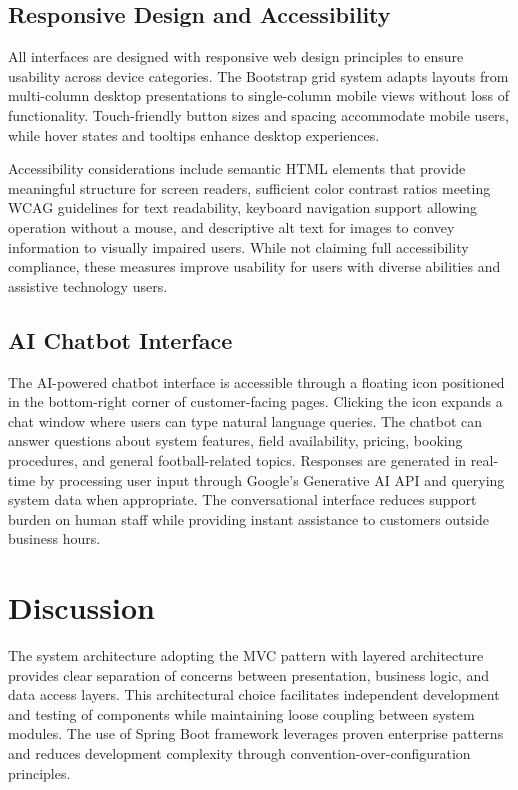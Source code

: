 \subsection{Responsive Design and Accessibility}

All interfaces are designed with responsive web design principles to ensure usability across device categories. The Bootstrap grid system adapts layouts from multi-column desktop presentations to single-column mobile views without loss of functionality. Touch-friendly button sizes and spacing accommodate mobile users, while hover states and tooltips enhance desktop experiences.

Accessibility considerations include semantic HTML elements that provide meaningful structure for screen readers, sufficient color contrast ratios meeting WCAG guidelines for text readability, keyboard navigation support allowing operation without a mouse, and descriptive alt text for images to convey information to visually impaired users. While not claiming full accessibility compliance, these measures improve usability for users with diverse abilities and assistive technology users.

\subsection{AI Chatbot Interface}

The AI-powered chatbot interface is accessible through a floating icon positioned in the bottom-right corner of customer-facing pages. Clicking the icon expands a chat window where users can type natural language queries. The chatbot can answer questions about system features, field availability, pricing, booking procedures, and general football-related topics. Responses are generated in real-time by processing user input through Google's Generative AI API and querying system data when appropriate. The conversational interface reduces support burden on human staff while providing instant assistance to customers outside business hours.

\section{Discussion}

The system architecture adopting the MVC pattern with layered architecture provides clear separation of concerns between presentation, business logic, and data access layers. This architectural choice facilitates independent development and testing of components while maintaining loose coupling between system modules. The use of Spring Boot framework leverages proven enterprise patterns and reduces development complexity through convention-over-configuration principles.

